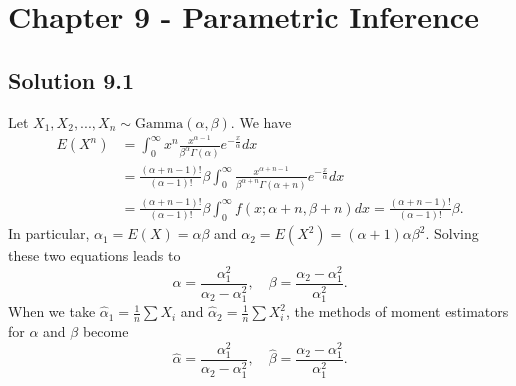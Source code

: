 \section*{Chapter 9 - Parametric Inference}

\subsection*{Solution 9.1}

Let $X_1, X_2, ..., X_n \sim \mathrm{Gamma}(\alpha, \beta)$.
We have
\begin{equation*}
    \begin{split}
        E(X^n)
            &= \int_0^{\infty} x^n \frac{x^{\alpha - 1}}{\beta^{\alpha} \Gamma(\alpha)} e^{-\frac{x}{\alpha}} dx \\
            &= \frac{(\alpha + n - 1)!}{(\alpha - 1)!} \beta \int_0^{\infty} \frac{x^{\alpha + n - 1}}{\beta^{\alpha + n} \Gamma(\alpha + n)} e^{-\frac{x}{\alpha}} dx \\
            &= \frac{(\alpha + n - 1)!}{(\alpha - 1)!} \beta \int_0^{\infty} f(x; \alpha + n, \beta + n) dx
            = \frac{(\alpha + n - 1)!}{(\alpha - 1)!} \beta.
    \end{split}
\end{equation*}
In particular, $\alpha_1 = E(X) = \alpha \beta$ and $\alpha_2 = E(X^2) = (\alpha + 1) \alpha \beta^2$.
Solving these two equations leads to
\begin{equation*}
    \alpha = \frac{\alpha_1^2}{\alpha_2 - \alpha_1^2}, \quad \beta = \frac{\alpha_2 - \alpha_1^2}{\alpha_1^2}.
\end{equation*}
When we take $\hat{\alpha}_1 = \frac{1}{n} \sum X_i$ and $\hat{\alpha}_2 = \frac{1}{n} \sum X_i^2$, the methods of moment estimators for $\alpha$ and $\beta$ become
\begin{equation*}
    \hat{\alpha} = \frac{\alpha_1^2}{\alpha_2 - \alpha_1^2}, \quad \hat{\beta} = \frac{\alpha_2 - \alpha_1^2}{\alpha_1^2}.
\end{equation*}
